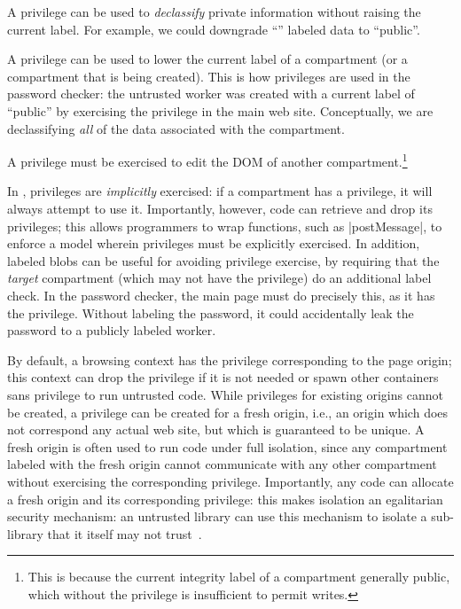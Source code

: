 \begin{CompactItemize}
    \item A privilege can be used to \emph{declassify} private
        information without raising the current label.  For example, we
        could downgrade ``'' labeled data to
        ``public''.

    \item A privilege can be used to lower the current label of
        a compartment (or a compartment that is being created).
        This is how privileges are used
        in the password checker: the untrusted worker was created
        with a current label of ``public'' by exercising the
         privilege in the main web site.  Conceptually, we
        are declassifying \emph{all} of the data associated with the
        compartment.

    \item A privilege must be exercised to edit the DOM
        of another compartment.\footnote{This is because the current
        integrity label of a compartment generally public, which
        without the privilege is insufficient to permit writes.}
\end{CompactItemize}

In \sys{}, privileges are \emph{implicitly} exercised: if a compartment
has a privilege, it will always attempt to use it.
%
Importantly, however, code can retrieve and drop its privileges; this
allows programmers to wrap functions, such as \js|postMessage|, to
enforce a model wherein privileges must be explicitly exercised.
%
In addition, labeled blobs can be useful for avoiding privilege
exercise, by requiring that the \emph{target} compartment (which may
not have the privilege) do an additional label check.
%
In the password checker, the main
page must do precisely this, as it has the  privilege.
%
Without labeling the password, it could accidentally leak the password
to a publicly labeled worker.

By default, a browsing context has the privilege corresponding to the
page origin; this context can drop the privilege if it is not
needed or spawn other containers sans privilege to run untrusted code.
%
While privileges for existing origins cannot be created, a privilege can
be created for a fresh origin, i.e., an origin which does not correspond
any actual web site, but which is guaranteed to be unique.
%
A fresh origin is often used to run code under full isolation, since any
compartment labeled with the fresh origin cannot communicate with any
other compartment without exercising the corresponding privilege.
%
Importantly, any code can allocate a fresh origin and its corresponding privilege: this
makes isolation an egalitarian security mechanism: an untrusted library
can use this mechanism to isolate a sub-library that it itself
may not trust~\cite{Zeldovich:2006}.

